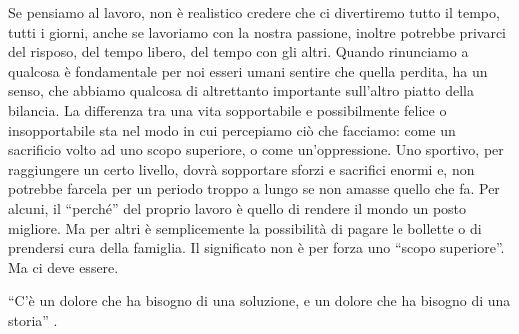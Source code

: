 \documentclass[12pt]{book} %
\begin{document}
Se pensiamo al lavoro, non è realistico credere che ci
divertiremo tutto il tempo, tutti i giorni, anche se lavoriamo con la nostra passione, inoltre potrebbe privarci del risposo, 
del tempo libero, del tempo con gli altri.
Quando rinunciamo a qualcosa è fondamentale per noi esseri umani sentire che quella perdita, ha un senso, che abbiamo
qualcosa di altrettanto importante sull'altro piatto della bilancia. La differenza tra una vita
sopportabile e possibilmente felice o insopportabile sta nel modo in cui percepiamo ciò che facciamo: come un
sacrificio volto ad uno scopo superiore, o come un'oppressione. Uno sportivo, per raggiungere un
certo livello, dovrà sopportare sforzi e sacrifici enormi e, non potrebbe farcela per un periodo troppo a lungo se non
amasse quello che fa. Per alcuni, il “perché” del proprio lavoro è quello di rendere il mondo un posto migliore. Ma per
altri è semplicemente la possibilità di pagare le bollette o di prendersi cura della famiglia. Il significato non è per
forza uno “scopo superiore”. Ma ci deve essere. 

“C'è un dolore che ha bisogno di una soluzione, e un dolore che ha bisogno di una storia” .
\end{document}
